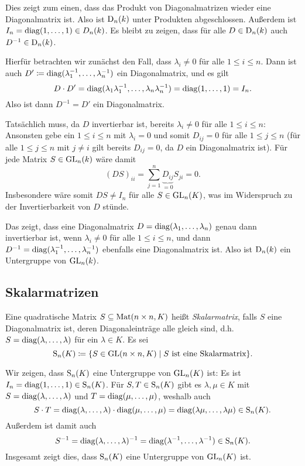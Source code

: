 Dies zeigt zum einen, dass das Produkt von Diagonalmatrizen wieder eine Diagonalmatrix ist. Also ist $\mathrm{D}_n(k)$ unter Produkten abgeschlossen. Außerdem ist $I_n = \mathrm{diag}(1, \dotsc, 1) \in D_n(k)$. Es bleibt zu zeigen, dass für alle $D \in \mathrm{D}_n(k)$ auch $D^{-1} \in \mathrm{D}_n(k)$.

Hierfür betrachten wir zunächst den Fall, dass $\lambda_i \neq 0$ für alle $1 \leq i \leq n$. Dann ist auch $D' \coloneqq \mathrm{diag}(\lambda_1^{-1}, \dotsc, \lambda_n^{-1})$ ein Diagonalmatrix, und es gilt
\[
 D \cdot D'
 = \mathrm{diag}(\lambda_1 \lambda_1^{-1}, \dotsc, \lambda_n \lambda_n^{-1})
 = \mathrm{diag}(1, \dotsc, 1)
 = I_n.
\]
Also ist dann $D^{-1} = D'$ ein Diagonalmatrix.

Tatsächlich muss, da $D$ invertierbar ist, bereits $\lambda_i \neq 0$ für alle $1 \leq i \leq n$: Ansonsten gebe ein $1 \leq i \leq n$ mit $\lambda_i = 0$ und somit $D_{ij} = 0$ für alle $1 \leq j \leq n$ (für alle $1 \leq j \leq n$ mit $j \neq i$ gilt bereits $D_{ij} = 0$, da $D$ ein Diagonalmatrix ist). Für jede Matrix $S \in \mathrm{GL}_n(k)$ wäre damit
\[
 (DS)_{ii}
 = \sum_{j=1}^n \underbrace{D_{ij}}_{=0} S_{ji}
 = 0.
\]
Insbesondere wäre somit $DS \neq I_n$ für alle $S \in \mathrm{GL}_n(K)$, was im Widerspruch zu der Invertierbarkeit von $D$ stünde.

Das zeigt, dass eine Diagonalmatrix $D = \mathrm{diag}(\lambda_1, \dotsc, \lambda_n)$ genau dann invertierbar ist, wenn $\lambda_i \neq 0$ für alle $1 \leq i \leq n$, und dann $D^{-1} = \mathrm{diag}(\lambda_1^{-1}, \dotsc, \lambda_n^{-1})$ ebenfalls eine Diagonalmatrix ist. Also ist $\mathrm{D}_n(k)$ ein Untergruppe von $\mathrm{GL}_n(k)$.


\subsection{Skalarmatrizen}
\begin{defi}
 Eine quadratische Matrix $S \subseteq \mathrm{Mat}(n \times n, K)$ heißt \emph{Skalarmatrix}, falls $S$ eine Diagonalmatrix ist, deren Diagonaleinträge alle gleich sind, d.h.\ $S = \mathrm{diag}(\lambda, \dotsc, \lambda)$ für ein $\lambda \in K$. Es sei
 \[
  \mathrm{S}_n(K) \coloneqq \{S \in \mathrm{GL}(n \times n, K) \mid \text{$S$ ist eine Skalarmatrix}\}.
 \]
\end{defi}
Wir zeigen, dass $\mathrm{S}_n(K)$ eine Untergruppe von $\mathrm{GL}_n(K)$ ist: Es ist $I_n = \mathrm{diag}(1, \dotsc, 1) \in \mathrm{S}_n(K)$. Für $S, T \in \mathrm{S}_n(K)$ gibt es $\lambda, \mu \in K$ mit $S = \mathrm{diag}(\lambda, \dotsc, \lambda)$ und $T = \mathrm{diag}(\mu, \dotsc, \mu)$, weshalb auch
\[
 S \cdot T
 = \mathrm{diag}(\lambda, \dotsc, \lambda) \cdot \mathrm{diag}(\mu, \dotsc, \mu)
 = \mathrm{diag}(\lambda \mu, \dotsc, \lambda \mu) \in \mathrm{S}_n(K).
\]
Außerdem ist damit auch
\[
 S^{-1}
 = \mathrm{diag}(\lambda, \dotsc, \lambda)^{-1}
 = \mathrm{diag}(\lambda^{-1}, \dotsc, \lambda^{-1}) \in \mathrm{S}_n(K).
\]
Insgesamt zeigt dies, dass $\mathrm{S}_n(K)$ eine Untergruppe von $\mathrm{GL}_n(K)$ ist.


